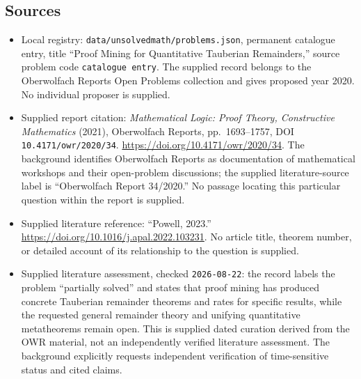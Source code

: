 \documentclass[11pt]{article}
\begin{document}
\subsection{Sources}
\begin{itemize}
\item Local registry: \texttt{data/unsolvedmath/problems.json}, permanent catalogue entry, title ``Proof Mining for Quantitative Tauberian Remainders,'' source problem code \texttt{catalogue entry}. The supplied record belongs to the Oberwolfach Reports Open Problems collection and gives proposed year 2020. No individual proposer is supplied.
\item Supplied report citation: \emph{Mathematical Logic: Proof Theory, Constructive Mathematics} (2021), Oberwolfach Reports, pp.\ 1693--1757, DOI \texttt{10.4171/owr/2020/34}. \url{https://doi.org/10.4171/owr/2020/34}. The background identifies Oberwolfach Reports as documentation of mathematical workshops and their open-problem discussions; the supplied literature-source label is ``Oberwolfach Report 34/2020.'' No passage locating this particular question within the report is supplied.
\item Supplied literature reference: ``Powell, 2023.'' \url{https://doi.org/10.1016/j.apal.2022.103231}. No article title, theorem number, or detailed account of its relationship to the question is supplied.
\item Supplied literature assessment, checked \texttt{2026-08-22}: the record labels the problem ``partially solved'' and states that proof mining has produced concrete Tauberian remainder theorems and rates for specific results, while the requested general remainder theory and unifying quantitative metatheorems remain open. This is supplied dated curation derived from the OWR material, not an independently verified literature assessment. The background explicitly requests independent verification of time-sensitive status and cited claims.
\end{itemize}
\end{document}
